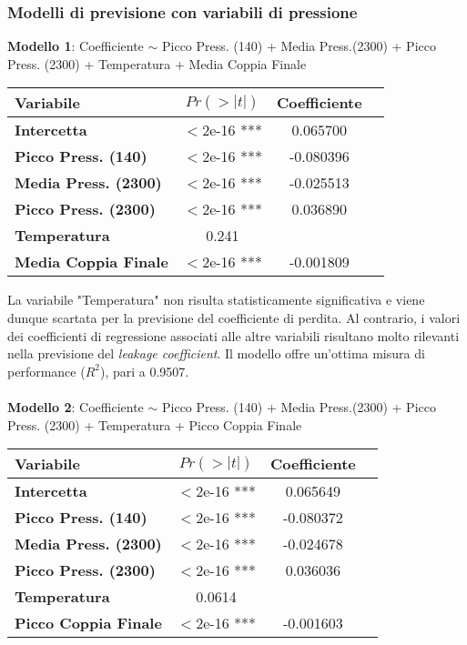 \documentclass[fleqn,10pt]{SelfArx} %
\begin{document}
\subsubsection{Modelli di previsione con variabili di pressione}
\textbf{Modello 1}: Coefficiente $\sim$  Picco Press. (140) + Media Press.(2300) + Picco Press. (2300) + Temperatura + Media Coppia Finale
{\begin{table}[H] 
\centering
\begin{tabular}[t]{lccc}
\toprule 
Variabile&$Pr(> |t|)$&Coefficiente\\
\midrule 
\textbf{Intercetta}&$<$2e-16 ***&0.065700\\ 
\textbf{Picco Press. (140)}&$<$2e-16 ***&-0.080396\\ 
\textbf{Media Press. (2300)}&$<$2e-16 ***&-0.025513\\ 
\textbf{Picco Press. (2300)}&$<$2e-16 ***&0.036890\\ 
\textbf{Temperatura}&0.241\\
\textbf{Media Coppia Finale}&$<$2e-16 ***&-0.001809\\
\bottomrule 
\end{tabular}
\end{table}}
La variabile "Temperatura" non risulta statisticamente significativa e viene dunque scartata per la previsione del coefficiente di perdita. Al contrario, i valori dei coefficienti di regressione associati alle altre variabili risultano molto rilevanti nella previsione del \textit{leakage coefficient}. Il modello offre un'ottima misura di performance ($R^2$), pari a 0.9507.\\
\\
\textbf{Modello 2}: Coefficiente $\sim$  Picco Press. (140) + Media Press.(2300) + Picco Press. (2300) + Temperatura + Picco Coppia Finale
{\begin{table}[h] 
\centering
\begin{tabular}[t]{lccc}
\toprule 
Variabile&$Pr(> |t|)$&Coefficiente\\
\midrule 
\textbf{Intercetta}&$<$2e-16 ***&0.065649\\ 
\textbf{Picco Press. (140)}&$<$2e-16 ***&-0.080372\\ 
\textbf{Media Press. (2300)}&$<$2e-16 ***&-0.024678\\ 
\textbf{Picco Press. (2300)}&$<$2e-16 ***&0.036036\\ 
\textbf{Temperatura}&0.0614\\
\textbf{Picco Coppia Finale}&$<$2e-16 ***&-0.001603\\
\bottomrule 
\end{tabular}
\end{table}}\\
\end{document}
